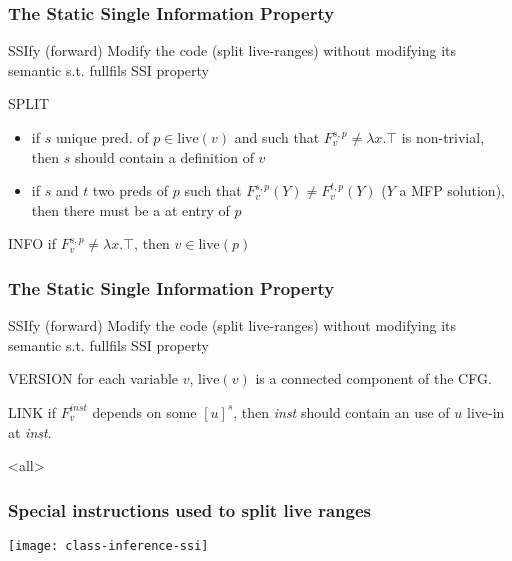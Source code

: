 \begin{frame}
\frametitle{The Static Single Information Property}
\begin{block}{SSIfy (forward)}
Modify the code (split live-ranges) without modifying its semantic s.t. fullfils SSI property
\end{block}
\begin{block}{SPLIT}
  \begin{itemize}
  \item if $s$ unique pred. of $p\in \textrm{live}(v)$ and such that $F_v^{s,p}\neq \lambda x.\top$ is non-trivial,
    then $s$ should contain a definition of $v$
  \item if $s$ and $t$ two preds of $p$ such that $F_v^{s,p}(Y)\neq F_v^{t,p}(Y)$ ($Y$ a MFP solution), then there must be a \phifun at entry of $p$
  \end{itemize}
\end{block}
\begin{block}{INFO}
if $F_v^{s,p} \neq \lambda x.\top$,
then $v\in \textrm{live}(p)$
\end{block}
\end{frame}
\begin{frame}
\frametitle{The Static Single Information Property}
\begin{block}{SSIfy (forward)}
Modify the code (split live-ranges) without modifying its semantic s.t. fullfils SSI property
\end{block}
\begin{block}{VERSION} 
for each variable $v$, $\textrm{live}(v)$ is a connected component of the CFG.
\end{block}
\begin{block}{LINK} 
if $F_v^{\textit{inst}}$ depends on some $[u]^s$,
then \textit{inst} should contain an use of $u$ live-in at \textit{inst}.
\end{block}
\end{frame}

\mode<all>
\begin{frame}
\frametitle{Special instructions used to split live ranges}
%
%
%
\vfill
\texttt{[image: class-inference-ssi]}
\end{frame}


